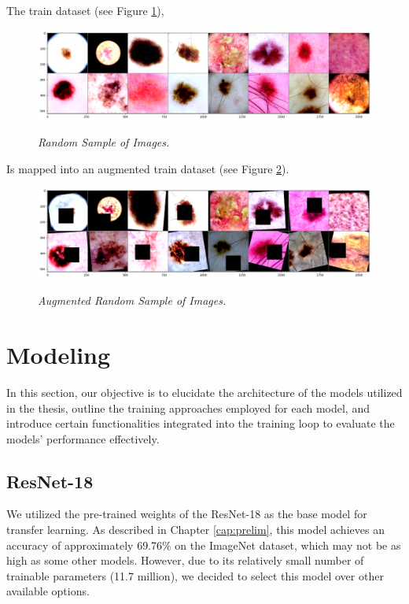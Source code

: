 The train dataset (see Figure \ref{fig:sample-of-datasets}),

\begin{figure}[H]
  \centering
  \includegraphics[width=\textwidth]{imatges/methodological_contribution/random-sample-of-isic.png}
  \caption[Random Sample of Images]{\textit{Random Sample of Images.}}
  {\label{fig:sample-of-datasets}}
\end{figure}

Is mapped into an augmented train dataset (see Figure \ref{fig:aug-sample-of-datasets}).

\begin{figure}[H]
  \centering
  \includegraphics[width=\textwidth]{imatges/methodological_contribution/random-sample-of-isic-augmented.png}
  \caption[Augmented Random Sample of Images]{\textit{Augmented Random Sample of Images.}}
  {\label{fig:aug-sample-of-datasets}}
\end{figure}

\newpage

\section{Modeling}

In this section, our objective is to elucidate the architecture of the models
utilized in the thesis, outline the training approaches employed for each
model, and introduce certain functionalities integrated into the training loop
to evaluate the models' performance effectively.

\subsection{ResNet-18}

We utilized the pre-trained weights of the ResNet-18 as the base model
for transfer learning. As described in Chapter \ref{cap:prelim}, this
model achieves an accuracy of approximately 69.76\% on the ImageNet
dataset, which may not be as high as some other models. However, due to its
relatively small number of trainable parameters (11.7 million), we decided to
select this model over other available options. \\

